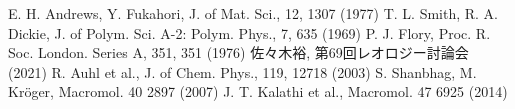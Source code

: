 \begin{thebibliography}{99}
     E. H. Andrews, Y. Fukahori, J. of Mat. Sci., 12, 1307 (1977)
     T. L. Smith, R. A. Dickie, J. of Polym. Sci. A-2: Polym. Phys., 7, 635 (1969)
     P. J. Flory, Proc. R. Soc. London. Series A, 351, 351 (1976)
     佐々木裕, 第69回レオロジー討論会 (2021)
     R. Auhl et al., J. of Chem. Phys., 119, 12718 (2003)
     S. Shanbhag, M. Kr\"{o}ger, Macromol. 40 2897 (2007)
     J. T. Kalathi et al., Macromol. 47 6925 (2014)
\end{thebibliography}